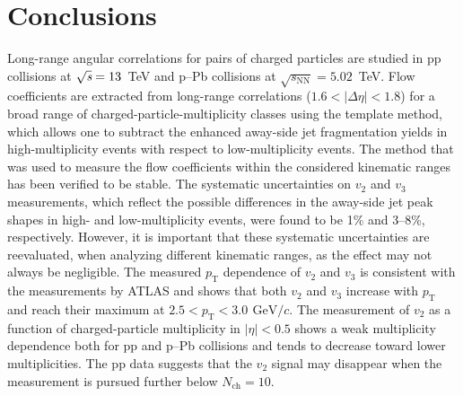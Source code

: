 
\section{Conclusions}
\label{sec:summary}
Long-range angular correlations for pairs of charged particles are studied in pp collisions at ${\sqrt{{\textit s}}}=13$~TeV and p--Pb collisions at $\sqrt{s_\mathrm{NN}} = 5.02$~TeV. Flow coefficients are extracted from long-range correlations ($1.6 <|\Delta\eta| < 1.8$) for a broad range of charged-particle-multiplicity classes using the template method, which allows one to subtract the enhanced away-side jet fragmentation yields in high-multiplicity events with respect to low-multiplicity events. The method that was used to measure the flow coefficients within the considered kinematic ranges has been verified to be stable.
The systematic uncertainties on $v_2$ and $v_3$ measurements, which reflect the possible differences in the away-side jet peak shapes in high- and low-multiplicity events, were found to be 1\% and 3–8\%, respectively. However, it is important that these systematic uncertainties are reevaluated, when analyzing different kinematic ranges, as the effect may not always be negligible.
The measured $p_\mathrm{T}$ dependence of $v_2$ and $v_3$ is consistent with the measurements by ATLAS and shows that both $v_2$ and $v_3$ increase with $p_\mathrm{T}$ and reach their maximum at $2.5<p_\mathrm{T}<3.0\,~\mathrm{GeV}/c$.
The measurement of $v_2$ as a function of charged-particle multiplicity in $|\eta|<0.5$ shows a weak multiplicity dependence both for pp and p--Pb collisions and tends to decrease toward lower multiplicities.
The pp data suggests that the $v_2$ signal may disappear when the measurement is pursued further below $N_{\mathrm{ch}} = 10$. 


